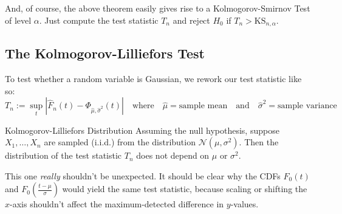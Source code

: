 And, of course, the above theorem
easily gives rise to a Kolmogorov-Smirnov Test
of level $\alpha$.
Just compute the test statistic $T_n$
and reject $H_0$ if $T_n > \mathrm{KS}_{n, \alpha}$.

\subsection{The Kolmogorov-Lilliefors Test}

To test whether a random variable is Gaussian,
we rework our test statistic like so:
\[
    T_n := \sup_t\left|
        \hat{F}_n(t) - \Phi_{\hat{\mu}, \hat{\sigma}^2}(t)
    \right| ~~~ \text{ where } ~~~
    \hat{\mu} = \text{sample mean} ~~~ \text{ and } ~~~
    \hat{\sigma}^2 = \text{sample variance}
\]

\begin{theorem}{Kolmogorov-Lilliefors Distribution}
    Assuming the null hypothesis,
    suppose $X_1, \dots, X_n$ are sampled (i.i.d.)
    from the distribution $\mathcal{N}(\mu, \sigma^2)$.
    Then the distribution of the test statistic $T_n$
    does not depend on $\mu$ or $\sigma^2$.
\end{theorem}

\begin{remark}
    This one \emph{really} shouldn't be unexpected.
    It should be clear why the CDFs $F_0(t)$ and
    $F_0\left(\frac{t - \mu}{\sigma}\right)$
    would yield the same test statistic,
    because scaling or shifting the $x$-axis
    shouldn't affect the maximum-detected
    difference in $y$-values.
\end{remark}

